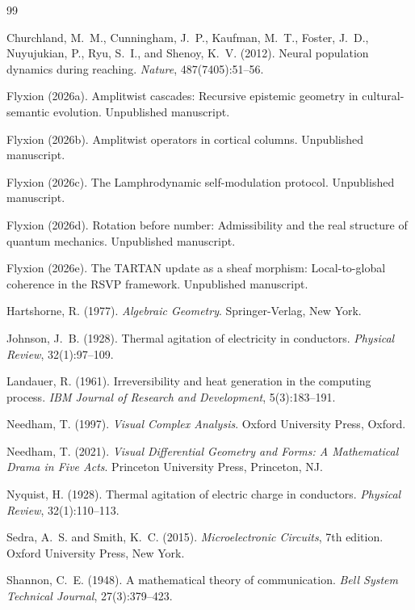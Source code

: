 \documentclass[11pt]{article}
\begin{document}
\begin{thebibliography}{99}

Churchland, M.~M., Cunningham, J.~P., Kaufman, M.~T., Foster, J.~D., Nuyujukian, P., Ryu, S.~I., and Shenoy, K.~V. (2012).
\newblock Neural population dynamics during reaching.
\newblock \emph{Nature}, 487(7405):51--56.

Flyxion (2026a).
\newblock Amplitwist cascades: Recursive epistemic geometry in cultural-semantic evolution.
\newblock Unpublished manuscript.

Flyxion (2026b).
\newblock Amplitwist operators in cortical columns.
\newblock Unpublished manuscript.

Flyxion (2026c).
\newblock The Lamphrodynamic self-modulation protocol.
\newblock Unpublished manuscript.

Flyxion (2026d).
\newblock Rotation before number: Admissibility and the real structure of quantum mechanics.
\newblock Unpublished manuscript.

Flyxion (2026e).
\newblock The TARTAN update as a sheaf morphism: Local-to-global coherence in the RSVP framework.
\newblock Unpublished manuscript.

Hartshorne, R. (1977).
\newblock \emph{Algebraic Geometry}.
\newblock Springer-Verlag, New York.

Johnson, J.~B. (1928).
\newblock Thermal agitation of electricity in conductors.
\newblock \emph{Physical Review}, 32(1):97--109.

Landauer, R. (1961).
\newblock Irreversibility and heat generation in the computing process.
\newblock \emph{IBM Journal of Research and Development}, 5(3):183--191.

Needham, T. (1997).
\newblock \emph{Visual Complex Analysis}.
\newblock Oxford University Press, Oxford.

Needham, T. (2021).
\newblock \emph{Visual Differential Geometry and Forms: A Mathematical Drama in Five Acts}.
\newblock Princeton University Press, Princeton, NJ.

Nyquist, H. (1928).
\newblock Thermal agitation of electric charge in conductors.
\newblock \emph{Physical Review}, 32(1):110--113.

Sedra, A.~S. and Smith, K.~C. (2015).
\newblock \emph{Microelectronic Circuits}, 7th edition.
\newblock Oxford University Press, New York.

Shannon, C.~E. (1948).
\newblock A mathematical theory of communication.
\newblock \emph{Bell System Technical Journal}, 27(3):379--423.

\end{thebibliography}
\end{document}

